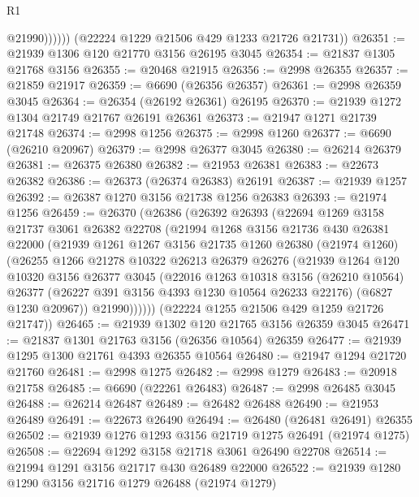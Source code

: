 \begin{lexlean}{R1}
\begin{coremodule}
                  @21990))))))
      (@22224 @1229 @21506 @429 @1233 @21726 @21731))
@26351 := @21939 @1306 @120 @21770 @3156 @26195 @3045
@26354 := @21837 @1305 @21768 @3156
@26355 := @20468 @21915
@26356 := @2998 @26355
@26357 := @21859 @21917
@26359 := @6690 (@26356 @26357)
@26361 := @2998 @26359 @3045
@26364 := @26354 (@26192 @26361) @26195
@26370 := @21939 @1272 @1304 @21749 @21767 @26191 @26361
@26373 := @21947 @1271 @21739 @21748
@26374 := @2998 @1256
@26375 := @2998 @1260
@26377 := @6690 (@26210 @20967)
@26379 := @2998 @26377 @3045
@26380 := @26214 @26379
@26381 := @26375 @26380
@26382 := @21953 @26381
@26383 := @22673 @26382
@26386 := @26373 (@26374 @26383) @26191
@26387 := @21939 @1257
@26392 := @26387 @1270 @3156 @21738 @1256 @26383
@26393 := @21974 @1256
@26459 := @26370
    (@26386
      (@26392
        @26393
        (@22694
          @1269
          @3158
          @21737
          @3061
          @26382
          @22708
          (@21994
            @1268
            @3156
            @21736
            @430
            @26381
            @22000
            (@21939
              @1261
              @1267
              @3156
              @21735
              @1260
              @26380
              (@21974 @1260)
              (@26255
                @1266
                @21278
                @10322
                @26213
                @26379
                @26276
                (@21939
                  @1264
                  @120
                  @10320
                  @3156
                  @26377
                  @3045
                  (@22016
                    @1263
                    @10318
                    @3156
                    (@26210 @10564)
                    @26377
                    (@26227 @391 @3156 @4393 @1230 @10564 @26233 @22176)
                    (@6827 @1230 @20967))
                  @21990))))))
      (@22224 @1255 @21506 @429 @1259 @21726 @21747))
@26465 := @21939 @1302 @120 @21765 @3156 @26359 @3045
@26471 := @21837 @1301 @21763 @3156 (@26356 @10564) @26359
@26477 := @21939 @1295 @1300 @21761 @4393 @26355 @10564
@26480 := @21947 @1294 @21720 @21760
@26481 := @2998 @1275
@26482 := @2998 @1279
@26483 := @20918 @21758
@26485 := @6690 (@22261 @26483)
@26487 := @2998 @26485 @3045
@26488 := @26214 @26487
@26489 := @26482 @26488
@26490 := @21953 @26489
@26491 := @22673 @26490
@26494 := @26480 (@26481 @26491) @26355
@26502 := @21939 @1276 @1293 @3156 @21719 @1275 @26491 (@21974 @1275)
@26508 := @22694 @1292 @3158 @21718 @3061 @26490 @22708
@26514 := @21994 @1291 @3156 @21717 @430 @26489 @22000
@26522 := @21939 @1280 @1290 @3156 @21716 @1279 @26488 (@21974 @1279)

\end{coremodule}
\end{lexlean}

